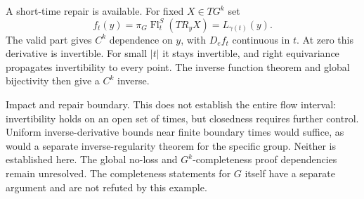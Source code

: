\documentclass[10pt]{article}
\begin{document}
A short-time repair is available. For fixed \(X\in TG^k\) set \[f_t(y)=\pi_G\operatorname{Fl}_t^S(T R_y X)=L_{\gamma(t)}(y).\] The valid part gives \(C^k\) dependence on \(y\), with \(D_e f_t\) continuous in \(t\). At zero this derivative is invertible. For small \(|t|\) it stays invertible, and right equivariance propagates invertibility to every point. The inverse function theorem and global bijectivity then give a \(C^k\) inverse.\par
Impact and repair boundary. This does not establish the entire flow interval: invertibility holds on an open set of times, but closedness requires further control. Uniform inverse-derivative bounds near finite boundary times would suffice, as would a separate inverse-regularity theorem for the specific group. Neither is established here. The global no-loss and \(G^k\)-completeness proof dependencies remain unresolved. The completeness statements for \(G\) itself have a separate argument and are not refuted by this example.\par
\end{document}
